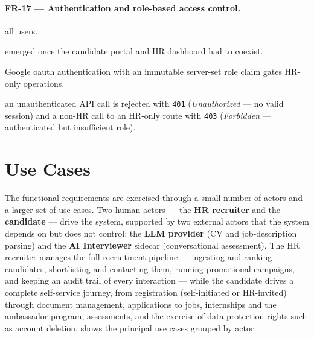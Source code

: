 \paragraph{FR-17 --- Authentication and role-based access control.}
\begin{description}[noitemsep]
	\item[Actor:] all users.
	\item[Rationale:] emerged once the candidate portal and HR dashboard had to coexist.
	\item[Behaviour:] Google \gls{oauth} authentication with an immutable server-set role claim gates HR-only operations.
	\item[Acceptance:] an unauthenticated API call is rejected with \texttt{401} (\emph{Unauthorized} --- no valid session) and a non-HR call to an HR-only route with \texttt{403} (\emph{Forbidden} --- authenticated but insufficient role).
\end{description}


\section{Use Cases}
\label{sec:analysis-usecases}

The functional requirements are exercised through a small number of actors
and a larger set of use cases. Two human actors --- the \textbf{HR recruiter}
and the \textbf{candidate} --- drive the system, supported by two external
actors that the system depends on but does not control: the \textbf{LLM
provider} (CV and job-description parsing) and the \textbf{AI Interviewer}
sidecar (conversational assessment). The HR recruiter manages the full
recruitment pipeline --- ingesting and ranking candidates, shortlisting and
contacting them, running promotional campaigns, and keeping an audit trail of
every interaction --- while the candidate drives a complete self-service
journey, from registration (self-initiated or HR-invited) through document
management, applications to jobs, internships and the ambassador program,
assessments, and the exercise of data-protection rights such as account
deletion.  shows the principal use cases grouped by
actor.

